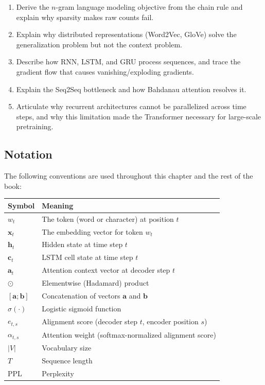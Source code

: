 \begin{enumerate}
    \item Derive the $n$-gram language modeling objective from the chain rule and explain why sparsity makes raw counts fail.
    \item Explain why distributed representations (Word2Vec, GloVe) solve the generalization problem but not the context problem.
    \item Describe how RNN, LSTM, and GRU process sequences, and trace the gradient flow that causes vanishing/exploding gradients.
    \item Explain the Seq2Seq bottleneck and how Bahdanau attention resolves it.
    \item Articulate why recurrent architectures cannot be parallelized across time steps, and why this limitation made the Transformer necessary for large-scale pretraining.
\end{enumerate}

\subsection*{Notation}

The following conventions are used throughout this chapter and the rest of the book:

\begin{center}
\begin{tabular}{ll}
\toprule
Symbol & Meaning \\
\midrule
$w_t$ & The token (word or character) at position $t$ \\
$\mathbf{x}_t$ & The embedding vector for token $w_t$ \\
$\mathbf{h}_t$ & Hidden state at time step $t$ \\
$\mathbf{c}_t$ & LSTM cell state at time step $t$ \\
$\mathbf{a}_t$ & Attention context vector at decoder step $t$ \\
$\odot$ & Elementwise (Hadamard) product \\
$[\mathbf{a}; \mathbf{b}]$ & Concatenation of vectors $\mathbf{a}$ and $\mathbf{b}$ \\
$\sigma(\cdot)$ & Logistic sigmoid function \\
$e_{t,s}$ & Alignment score (decoder step $t$, encoder position $s$) \\
$\alpha_{t,s}$ & Attention weight (softmax-normalized alignment score) \\
$|V|$ & Vocabulary size \\
$T$ & Sequence length \\
PPL & Perplexity \\
\bottomrule
\end{tabular}
\end{center}

